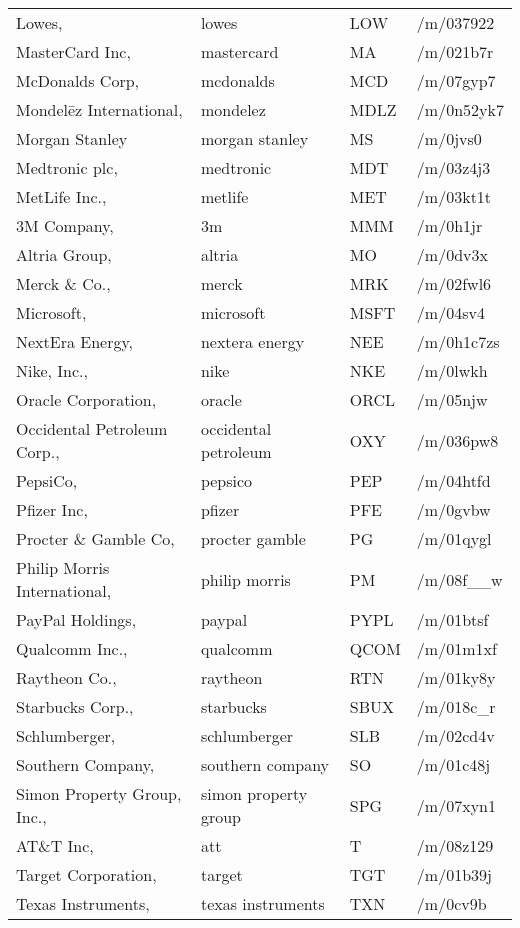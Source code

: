 \begin{longtable}[c]{llll}
Lowes, & lowes & LOW & /m/037922 \\
MasterCard Inc, & mastercard & MA & /m/021b7r \\
McDonalds Corp, & mcdonalds & MCD & /m/07gyp7 \\
Mondelēz International, & mondelez & MDLZ & /m/0n52yk7 \\
Morgan Stanley & morgan stanley & MS & /m/0jvs0 \\
Medtronic plc, & medtronic & MDT & /m/03z4j3 \\
MetLife Inc., & metlife & MET & /m/03kt1t \\
3M Company, & 3m & MMM & /m/0h1jr \\
Altria Group, & altria & MO & /m/0dv3x \\
Merck \& Co., & merck & MRK & /m/02fwl6 \\
Microsoft, & microsoft & MSFT & /m/04sv4 \\
NextEra Energy, & nextera energy & NEE & /m/0h1c7zs \\
Nike, Inc., & nike & NKE & /m/0lwkh \\
Oracle Corporation, & oracle & ORCL & /m/05njw \\
Occidental Petroleum Corp., & occidental petroleum & OXY & /m/036pw8 \\
PepsiCo, & pepsico & PEP & /m/04htfd \\
Pfizer Inc, & pfizer & PFE & /m/0gvbw \\
Procter \& Gamble Co, & procter gamble & PG & /m/01qygl \\
Philip Morris International, & philip morris & PM & /m/08f\_\_w \\
PayPal Holdings, & paypal & PYPL & /m/01btsf \\
Qualcomm Inc., & qualcomm & QCOM & /m/01m1xf \\
Raytheon Co., & raytheon & RTN & /m/01ky8y \\
Starbucks Corp., & starbucks & SBUX & /m/018c\_r \\
Schlumberger, & schlumberger & SLB & /m/02cd4v \\
Southern Company, & southern company & SO & /m/01c48j \\
Simon Property Group, Inc., & simon property group & SPG & /m/07xyn1 \\
AT\&T Inc, & att & T & /m/08z129 \\
Target Corporation, & target & TGT & /m/01b39j \\
Texas Instruments, & texas instruments & TXN & /m/0cv9b \\

\end{longtable}

